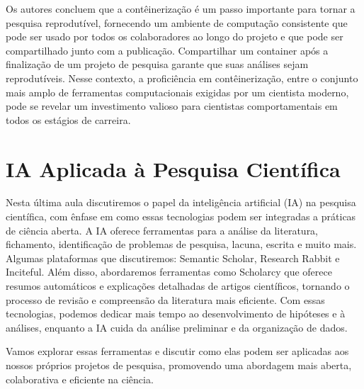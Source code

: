 \documentclass[
  a4paper,
]{book}
\begin{document}
\begin{tcolorbox}
Os autores concluem que a contêinerização é um passo importante para
tornar a pesquisa reprodutível, fornecendo um ambiente de computação
consistente que pode ser usado por todos os colaboradores ao longo do
projeto e que pode ser compartilhado junto com a publicação.
Compartilhar um container após a finalização de um projeto de pesquisa
garante que suas análises sejam reprodutíveis. Nesse contexto, a
proficiência em contêinerização, entre o conjunto mais amplo de
ferramentas computacionais exigidas por um cientista moderno, pode se
revelar um investimento valioso para cientistas comportamentais em todos
os estágios de carreira.

\end{tcolorbox}


\chapter{IA Aplicada à Pesquisa Científica}\label{sec-AI}

Nesta última aula discutiremos o papel da inteligência artificial (IA)
na pesquisa científica, com ênfase em como essas tecnologias podem ser
integradas a práticas de ciência aberta. A IA oferece ferramentas para a
análise da literatura, fichamento, identificação de problemas de
pesquisa, lacuna, escrita e muito mais. Algumas plataformas que
discutiremos: Semantic Scholar, Research Rabbit e Inciteful. Além disso,
abordaremos ferramentas como Scholarcy que oferece resumos automáticos e
explicações detalhadas de artigos científicos, tornando o processo de
revisão e compreensão da literatura mais eficiente. Com essas
tecnologias, podemos dedicar mais tempo ao desenvolvimento de hipóteses
e à análises, enquanto a IA cuida da análise preliminar e da organização
de dados.

Vamos explorar essas ferramentas e discutir como elas podem ser
aplicadas aos nossos próprios projetos de pesquisa, promovendo uma
abordagem mais aberta, colaborativa e eficiente na ciência.
\end{document}
